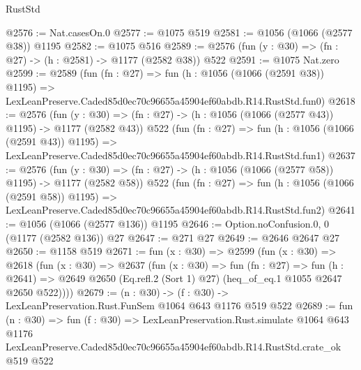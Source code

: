\begin{lexlean}{RustStd}
\begin{coremodule}
@2576 := Nat.casesOn.{0}
@2577 := @1075 @519
@2581 := @1056 (@1066 (@2577 @38)) @1195
@2582 := @1075 @516
@2589 := @2576 (fun (y : @30) => (fn : @27) -> (h : @2581) -> @1177 (@2582 @38)) @522
@2591 := @1075 Nat.zero
@2599 := @2589
    (fun (fn : @27) =>
    fun (h : @1056 (@1066 (@2591 @38)) @1195) =>
    LexLeanPreserve.Caded85d0ec70c96655a45904ef60abdb.R14.RustStd.fun0)
@2618 := @2576
    (fun (y : @30) => (fn : @27) -> (h : @1056 (@1066 (@2577 @43)) @1195) -> @1177 (@2582 @43))
    @522
    (fun (fn : @27) =>
    fun (h : @1056 (@1066 (@2591 @43)) @1195) =>
    LexLeanPreserve.Caded85d0ec70c96655a45904ef60abdb.R14.RustStd.fun1)
@2637 := @2576
    (fun (y : @30) => (fn : @27) -> (h : @1056 (@1066 (@2577 @58)) @1195) -> @1177 (@2582 @58))
    @522
    (fun (fn : @27) =>
    fun (h : @1056 (@1066 (@2591 @58)) @1195) =>
    LexLeanPreserve.Caded85d0ec70c96655a45904ef60abdb.R14.RustStd.fun2)
@2641 := @1056 (@1066 (@2577 @136)) @1195
@2646 := Option.noConfusion.{0, 0} (@1177 (@2582 @136)) @27
@2647 := @271 @27
@2649 := @2646 @2647 @27
@2650 := @1158 @519
@2671 := fun (x : @30) =>
  @2599
    (fun (x : @30) =>
    @2618
      (fun (x : @30) =>
      @2637
        (fun (x : @30) =>
        fun (fn : @27) =>
        fun (h : @2641) =>
        @2649 @2650 (Eq.refl.{2} (Sort 1) @27) (heq_of_eq.{1} @1055 @2647 @2650 @522))))
@2679 := (n : @30) -> (f : @30) -> LexLeanPreservation.Rust.FunSem @1064 @643 @1176 @519 @522
@2689 := fun (n : @30) =>
  fun (f : @30) =>
  LexLeanPreservation.Rust.simulate
    @1064
    @643
    @1176
    LexLeanPreserve.Caded85d0ec70c96655a45904ef60abdb.R14.RustStd.crate_ok
    @519
    @522
\end{coremodule}
\end{lexlean}
